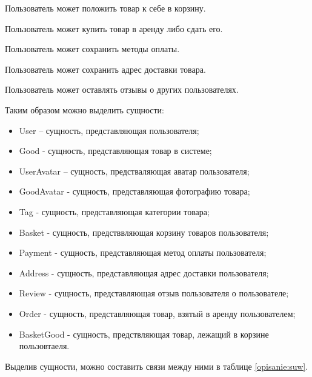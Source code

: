 Пользователь может положить товар к себе в корзину.

Пользователь может купить товар в аренду либо сдать его.

Пользователь может сохранить методы оплаты.

Пользователь может сохранить адрес доставки товара.

Пользователь может оставлять отзывы о других пользователях.

Таким образом можно выделить сущности:
\begin{itemize}
    \item User – сущность, представляющая пользователя;
    \item Good - сущность, представляющая товар в системе;
    \item UserAvatar – сущность, предстваляющая аватар пользователя;
    \item GoodAvatar - сущность, представляющая фотографию товара;
    \item Tag - сущность, представляющая категории товара;
    \item Basket - сущность, предстввляющая корзину товаров пользователя;
    \item Payment - сущность, представляющая метод оплаты пользователя;
    \item Address - сущность, представляющая адрес доставки пользователя;
    \item Review - сущность, представляющая отзыв пользователя о пользователе;
    \item Order - сущность, представляющая товар, взятый в аренду пользователем;
    \item BasketGood - сущность, предствляющая товар, лежащий в корзине пользовтаеля.
\end{itemize}

Выделив сущности, можно составить связи между ними в таблице \ref{opisanie:suw}.


